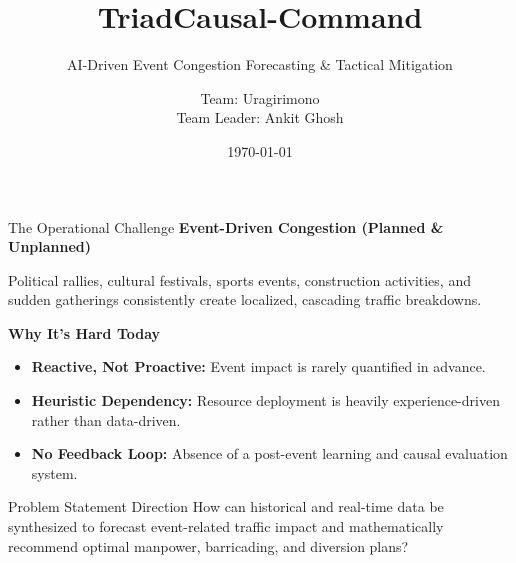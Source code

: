 \documentclass[aspectratio=169]{beamer}
\title{TriadCausal-Command}
\subtitle{AI-Driven Event Congestion Forecasting \& Tactical Mitigation}
\author{Team: Uragirimono \\ Team Leader: Ankit Ghosh}
\date{\today}
\begin{document}
\maketitle

\begin{frame}{The Operational Challenge}
    \textbf{Event-Driven Congestion (Planned \& Unplanned)}
    \vspace{0.5em}
    
    Political rallies, cultural festivals, sports events, construction activities, and sudden gatherings consistently create localized, cascading traffic breakdowns.
    
    \vspace{1em}
    \textbf{Why It's Hard Today}
    \begin{itemize}
        \item \textbf{Reactive, Not Proactive:} Event impact is rarely quantified in advance.
        \item \textbf{Heuristic Dependency:} Resource deployment is heavily experience-driven rather than data-driven.
        \item \textbf{No Feedback Loop:} Absence of a post-event learning and causal evaluation system.
    \end{itemize}
    
    \vspace{1em}
    \begin{alertblock}{Problem Statement Direction}
        How can historical and real-time data be synthesized to forecast event-related traffic impact and mathematically recommend optimal manpower, barricading, and diversion plans?
    \end{alertblock}
\end{frame}
\end{document}
